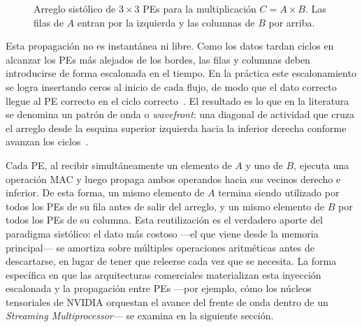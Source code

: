 \documentclass[conference]{IEEEtran}
\begin{document}
\begin{figure}[t]
\centering
{}
\caption{Arreglo sistólico de $3\times 3$ PEs para la multiplicación $C = A \times B$. Las filas de $A$ entran por la izquierda y las columnas de $B$ por arriba.}
\label{fig:sa-grid}
\end{figure}

Esta propagación no es instantánea ni libre. Como los datos tardan ciclos en alcanzar los PEs más alejados de los bordes, las filas y columnas deben introducirse de forma escalonada en el tiempo. En la práctica este escalonamiento se logra insertando ceros al inicio de cada flujo, de modo que el dato correcto llegue al PE correcto en el ciclo correcto~\cite{puscasu2024sa}. El resultado es lo que en la literatura se denomina un patrón de onda o \textit{wavefront}: una diagonal de actividad que cruza el arreglo desde la esquina superior izquierda hacia la inferior derecha conforme avanzan los ciclos~\cite{liao2025nn}.

Cada PE, al recibir simultáneamente un elemento de $A$ y uno de $B$, ejecuta una operación MAC y luego propaga ambos operandos hacia sus vecinos derecho e inferior. De esta forma, un mismo elemento de $A$ termina siendo utilizado por todos los PEs de su fila antes de salir del arreglo, y un mismo elemento de $B$ por todos los PEs de su columna. Esta reutilización es el verdadero aporte del paradigma sistólico: el dato más costoso ---el que viene desde la memoria principal--- se amortiza sobre múltiples operaciones aritméticas antes de descartarse, en lugar de tener que releerse cada vez que se necesita. La forma específica en que las arquitecturas comerciales materializan esta inyección escalonada y la propagación entre PEs ---por ejemplo, cómo los núcleos tensoriales de NVIDIA orquestan el avance del frente de onda dentro de un \textit{Streaming Multiprocessor}--- se examina en la siguiente sección.
\end{document}
